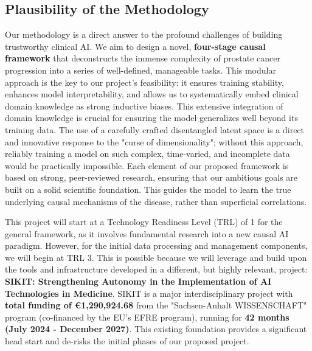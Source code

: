 \documentclass[11pt, a4paper]{article}
\begin{document}
\subsection{Plausibility of the Methodology}
Our methodology is a direct answer to the profound challenges of building trustworthy clinical AI. We aim to design a novel, \textbf{four-stage causal framework} that deconstructs the immense complexity of prostate cancer progression into a series of well-defined, manageable tasks. This modular approach is the key to our project's feasibility: it ensures training stability, enhances model interpretability, and allows us to systematically embed clinical domain knowledge as strong inductive biases. This extensive integration of domain knowledge is crucial for ensuring the model generalizes well beyond its training data. The use of a carefully crafted disentangled latent space is a direct and innovative response to the "curse of dimensionality"; without this approach, reliably training a model on such complex, time-varied, and incomplete data would be practically impossible. Each element of our proposed framework is based on strong, peer-reviewed research, ensuring that our ambitious goals are built on a solid scientific foundation. This guides the model to learn the true underlying causal mechanisms of the disease, rather than superficial correlations.

This project will start at a Technology Readiness Level (TRL) of 1 for the general framework, as it involves fundamental research into a new causal AI paradigm. However, for the initial data processing and management components, we will begin at TRL 3. This is possible because we will leverage and build upon the tools and infrastructure developed in a different, but highly relevant, project: \textbf{SIKIT: Strengthening Autonomy in the Implementation of AI Technologies in Medicine}. SIKIT is a major interdisciplinary project with \textbf{total funding of €1,290,924.68} from the "Sachsen-Anhalt WISSENSCHAFT" program (co-financed by the EU's EFRE program), running for \textbf{42 months (July 2024 - December 2027)}. This existing foundation provides a significant head start and de-risks the initial phases of our proposed project.
\end{document}
